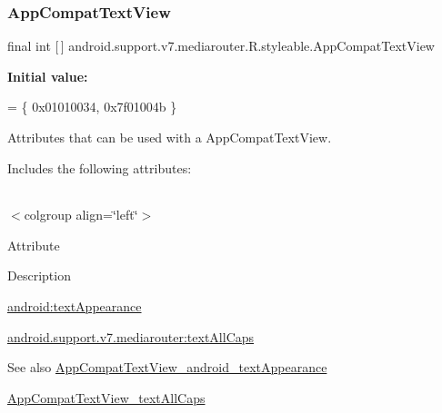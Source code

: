 \subsubsection{\texorpdfstring{App\+Compat\+Text\+View}{AppCompatTextView}}
{\footnotesize\ttfamily final int \mbox{[}$\,$\mbox{]} android.\+support.\+v7.\+mediarouter.\+R.\+styleable.\+App\+Compat\+Text\+View\hspace{0.3cm}{\ttfamily [static]}}

{\bfseries Initial value\+:}
\begin{DoxyCode}
= \{
            0x01010034, 0x7f01004b
        \}
\end{DoxyCode}
Attributes that can be used with a App\+Compat\+Text\+View. 

Includes the following attributes\+:

\tabulinesep=1mm
\begin{longtabu} spread 0pt [c]{*{0}{|X[-1]}|}
\hline
\end{longtabu}
$<$colgroup align=\char`\"{}left\char`\"{}$>$ 

Attribute

Description 

{\ttfamily \hyperlink{classandroid_1_1support_1_1v7_1_1mediarouter_1_1R_1_1styleable_a48337a5c6a8f6cfe43df3b40d1756018}{android\+:text\+Appearance}}

{\ttfamily \hyperlink{classandroid_1_1support_1_1v7_1_1mediarouter_1_1R_1_1styleable_a158abba218ddea699db0d0ec5c5595f1}{android.\+support.\+v7.\+mediarouter\+:text\+All\+Caps}}

\begin{DoxySeeAlso}{See also}
\hyperlink{classandroid_1_1support_1_1v7_1_1mediarouter_1_1R_1_1styleable_a48337a5c6a8f6cfe43df3b40d1756018}{App\+Compat\+Text\+View\+\_\+android\+\_\+text\+Appearance} 

\hyperlink{classandroid_1_1support_1_1v7_1_1mediarouter_1_1R_1_1styleable_a158abba218ddea699db0d0ec5c5595f1}{App\+Compat\+Text\+View\+\_\+text\+All\+Caps} 
\end{DoxySeeAlso}
\mbox{\label{classandroid_1_1support_1_1v7_1_1mediarouter_1_1R_1_1styleable_a48337a5c6a8f6cfe43df3b40d1756018}} 
